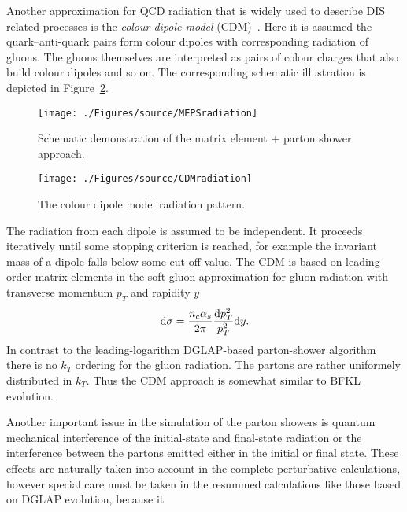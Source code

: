 Another approximation for QCD radiation that is widely used to describe DIS related processes is the \emph{colour dipole model} (CDM)~\cite{cdm}. Here it is assumed the quark--anti-quark pairs form colour dipoles with corresponding radiation of gluons. The gluons themselves are interpreted as pairs of colour charges that also build colour dipoles and so on. The corresponding schematic illustration is depicted in Figure~\ref{fig:cdm}. 
\begin{figure}[t]
	\centering
		\texttt{[image: ./Figures/source/MEPSradiation]}
	\caption{Schematic demonstration of the matrix element + parton shower approach.}
\label{fig:meps}
\end{figure}
\begin{figure}[t]%
\centering
\texttt{[image: ./Figures/source/CDMradiation]}%
\caption{The colour dipole model radiation pattern.}%
\label{fig:cdm}%
\end{figure}
The radiation from each dipole is assumed to be independent. It proceeds iteratively until some stopping criterion is reached, for example the invariant mass of a dipole falls below some cut-off  value. The CDM is based on leading-order matrix elements in the soft gluon approximation for gluon radiation with transverse momentum $p_T$ and rapidity $y$
\begin{equation}
\mathrm{d}\sigma = \frac{n_c\mbox{$\alpha_{s}$}}{2\pi}\frac{\mathrm{d}p_T^2}{p_T^2}\mathrm{d}y.
\end{equation}
In contrast to the leading-logarithm DGLAP-based parton-shower algorithm there is no $k_T$ ordering for the gluon radiation. The partons are rather uniformely distributed in $k_T$. Thus the CDM approach is somewhat similar to BFKL evolution.

Another important issue in the simulation of the parton showers is quantum mechanical interference of the initial-state and final-state radiation or the interference between the partons emitted either in the initial or final state. These effects are naturally taken into account in the complete perturbative calculations, however special care must be taken in the resummed calculations like those based on DGLAP evolution, because it 

